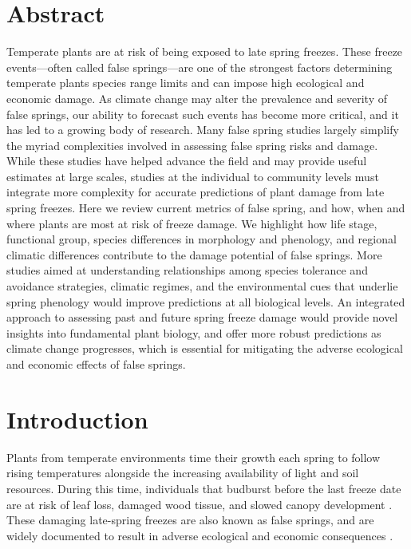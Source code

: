 \documentclass{article}\usepackage[]{graphicx}\usepackage[]{color}
\begin{document}
\section*{Abstract} %
Temperate plants are at risk of being exposed to late spring freezes. These freeze events---often called false springs---are one of the strongest factors determining temperate plants species range limits and can impose high ecological and economic damage. As climate change may alter the prevalence and severity of false springs, our ability to forecast such events has become more critical, and it has led to a growing body of research. Many false spring studies largely simplify the myriad complexities involved in assessing false spring risks and damage. While these studies have helped advance the field and may provide useful estimates at large scales, studies at the individual to community levels must integrate more complexity for accurate predictions of plant damage from late spring freezes. Here we review current metrics of false spring, and how, when and where plants are most at risk of freeze damage. We highlight how life stage, functional group, species differences in morphology and phenology, and regional climatic differences contribute to the damage potential of false springs. More studies aimed at understanding relationships among species tolerance and avoidance strategies, climatic regimes, and the environmental cues that underlie spring phenology would improve predictions at all biological levels. An integrated approach to assessing past and future spring freeze damage would provide novel insights into fundamental plant biology, and offer more robust predictions as climate change progresses, which is essential for mitigating the adverse ecological and economic effects of false springs. 

\section*{Introduction}

Plants from temperate environments time their growth each spring to follow rising temperatures alongside the increasing availability of light and soil resources. During this time, individuals that budburst before the last freeze date are at risk of leaf loss, damaged wood tissue, and slowed canopy development \citep{Gu2008, Hufkens2012}. These damaging late-spring freezes are also known as false springs, and are widely documented to result in adverse ecological and economic consequences \citep{Ault2013, Knudson2012}.
\end{document}
